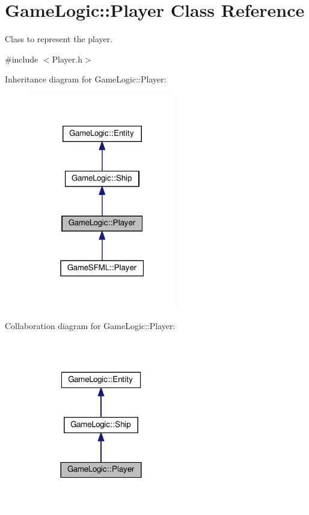 \hypertarget{classGameLogic_1_1Player}{}\section{Game\+Logic\+:\+:Player Class Reference}
\label{classGameLogic_1_1Player}


Class to represent the player.  




{\ttfamily \#include $<$Player.\+h$>$}



Inheritance diagram for Game\+Logic\+:\+:Player\+:
\nopagebreak
\begin{figure}[H]
\begin{center}
\leavevmode
\includegraphics[width=183pt]{classGameLogic_1_1Player__inherit__graph}
\end{center}
\end{figure}


Collaboration diagram for Game\+Logic\+:\+:Player\+:
\nopagebreak
\begin{figure}[H]
\begin{center}
\leavevmode
\includegraphics[width=180pt]{classGameLogic_1_1Player__coll__graph}
\end{center}
\end{figure}
